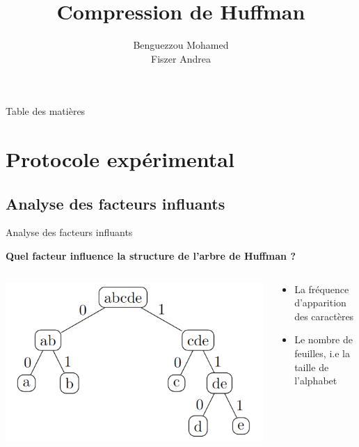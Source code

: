 \documentclass{beamer}
\title{Compression de Huffman}
\author{Benguezzou Mohamed \\ Fiszer Andrea}
\institute{Licence 2 semestre 4}
\date{}
\begin{document}
\begin{frame}
    \titlepage
\end{frame}

\begin{frame}{Table des matières}
    \tableofcontents
\end{frame}

\section{Protocole expérimental}
\subsection{Analyse des facteurs influants}

\begin{frame}{Analyse des facteurs influants}

    \begin{center}
        \large\textbf{Quel facteur influence la structure de l'arbre de Huffman ?}
    \end{center}

    \begin{columns}[T]

        \begin{column}{0.5\textwidth}
            \includegraphics[width=\textwidth]{../assets/huffman-tree-example.png}
        \end{column}

        \begin{column}{0.5\textwidth}
            \vspace{20pt}
            \centering

            \begin{itemize}
                \item La fréquence d'apparition des caractères
                \item Le nombre de feuilles, i.e la taille de l'alphabet
            \end{itemize}

        \end{column}
    \end{columns}
\end{frame}
\end{document}
